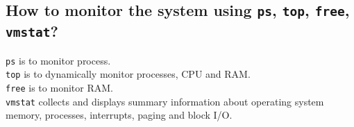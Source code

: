 \documentclass[12pt,a4paper]{article}
\theoremstyle{definition}
\begin{document}
\subsection{How to monitor the system using \texttt{ps}, \texttt{top}, \texttt{free}, \texttt{vmstat}?}
    \texttt{ps} is to monitor process. \\
    \texttt{top} is to dynamically monitor processes, CPU and RAM. \\
    \texttt{free} is to monitor RAM. \\
    \texttt{vmstat} collects and displays summary information about operating system memory, processes, interrupts, paging and block I/O.
\end{document}
